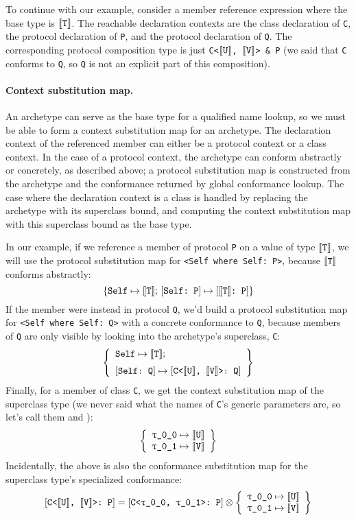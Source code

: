 \documentclass[../generics]{subfiles}
\begin{document}
To continue with our example, consider a member reference expression where the base type is $[\![\texttt{T}]\!]$. The reachable declaration contexts are the class declaration of \texttt{C}, the protocol declaration of \texttt{P}, and the protocol declaration of \texttt{Q}.
The corresponding protocol composition type is just \texttt{C<$[\![\texttt{U}]\!]$, $[\![\texttt{V}]\!]$> \& P} (we said that \texttt{C} conforms to \texttt{Q}, so \texttt{Q} is not an explicit part of this composition).

\paragraph{Context substitution map.} An archetype can serve as the base type for a qualified name lookup, so we must be able to form a context substitution map for an archetype. The declaration context of the referenced member can either be a protocol context or a class context. In the case of a protocol context, the archetype can conform abstractly or concretely, as described above; a protocol substitution map is constructed from the archetype and the conformance returned by global conformance lookup. The case where the declaration context is a class is handled by replacing the archetype with its superclass bound, and computing the context substitution map with this superclass bound as the base type.

In our example, if we reference a member of protocol \texttt{P} on a value of type $[\![\texttt{T}]\!]$, we will use the protocol substitution map for \verb|<Self where Self: P>|, because $[\![\texttt{T}]\!]$ conforms abstractly:
\[
\{\texttt{Self} \mapsto \texttt{$[\![\texttt{T}]\!]$};\,[\texttt{Self:~P}] \mapsto [\texttt{$[\![\texttt{T}]\!]$:~P}]\}
\]
If the member were instead in protocol \texttt{Q}, we'd build a protocol substitution map for \verb|<Self where Self: Q>| with a concrete conformance to \texttt{Q}, because members of \texttt{Q} are only visible by looking into the archetype's superclass, \texttt{C}:
\[
\SubstMapLongC{\SubstType{Self}{$\archetype{T}$}}{\SubstConf{Self}{C<$\archetype{U}$, $\archetype{V}$>}{Q}}
\]
Finally, for a member of class \texttt{C}, we get the context substitution map of the superclass type (we never said what the names of \texttt{C}'s generic parameters are, so let's call them  and ):
\[
\left\{\begin{array}{l}\texttt{\texttt{$\uptau$\_0\_0}} \mapsto \texttt{$[\![\texttt{U}]\!]$}\\\texttt{\texttt{$\uptau$\_0\_1}} \mapsto \texttt{$[\![\texttt{V}]\!]$}\end{array}\right\}
\]
Incidentally, the above is also the conformance substitution map for the superclass type's specialized conformance:
\[
\ConfReq{C<$\archetype{U}$, $\archetype{V}$>}{P} = \ConfReq{C<\ttgp{0}{0}, \ttgp{0}{1}>}{P} \otimes \SubstMapLong{\SubstType{\ttgp{0}{0}}{$\archetype{U}$}\\\SubstType{\ttgp{0}{1}}{$\archetype{V}$}}
\]
\end{document}
